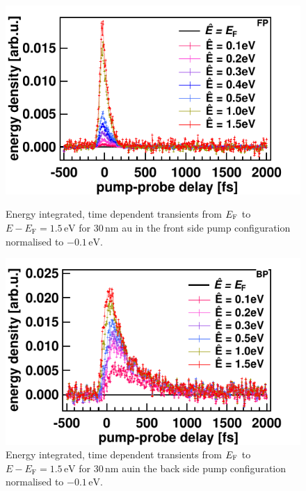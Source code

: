 \documentclass[a4paper,12pt,twoside]{article}
\begin{document}
	\begin{figure}[H]
		\begin{minipage}[t]{.44\linewidth}
			\includegraphics[width=\linewidth]{figures/30nmFPNorm.pdf}
			\caption{Energy integrated, time dependent transients from $E_{\rm{F}}$ to $E - E_\mathrm{F} = 1.5\,\mathrm{{eV}}$ for $30\,\mathrm{{nm}}$ \gls{au} in the front side pump configuration normalised to $-0.1\,\mathrm{{eV}}$.}
	    		\label{30nmFPNorm}
		\end{minipage}
	\hspace{.075\linewidth}
		\begin{minipage}[t]{.44\linewidth}
			\includegraphics[width=\linewidth]{figures/30nmBPNorm.pdf}
			\caption{Energy integrated, time dependent transients from $E_{\rm{F}}$ to $E - E_\mathrm{F} = 1.5\,\mathrm{{eV}}$ for $30\,\mathrm{{nm}}$ \gls{au}in the back side pump configuration normalised to $-0.1\,\mathrm{{eV}}$.}
	    		\label{30nmBPNorm}
		\end{minipage}
	\end{figure}
\end{document}
